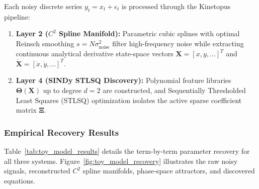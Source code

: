 \documentclass[11pt,a4paper]{article}
\begin{document}
Each noisy discrete series $y_t = x_t + \epsilon_t$ is processed through the Kinetopus pipeline:
\begin{enumerate}[leftmargin=1.5em]
    \item \textbf{Layer 2 ($C^2$ Spline Manifold):} Parametric cubic splines with optimal Reinsch smoothing $s = N \sigma_{\text{noise}}^2$ \cite{reinsch1967smoothing} filter high-frequency noise while extracting continuous analytical derivative state-space vectors $\mathbf{X} = [x, y, \dots]^T$ and $\dot{\mathbf{X}} = [\dot{x}, \dot{y}, \dots]^T$.
    \item \textbf{Layer 4 (SINDy STLSQ Discovery):} Polynomial feature libraries $\boldsymbol{\Theta}(\mathbf{X})$ up to degree $d = 2$ are constructed, and Sequentially Thresholded Least Squares (STLSQ) optimization isolates the active sparse coefficient matrix $\boldsymbol{\Xi}$.
\end{enumerate}

\subsubsection{Empirical Recovery Results}

Table~\ref{tab:toy_model_results} details the term-by-term parameter recovery for all three systems. Figure~\ref{fig:toy_model_recovery} illustrates the raw noisy signals, reconstructed $C^2$ spline manifolds, phase-space attractors, and discovered equations.
\end{document}

